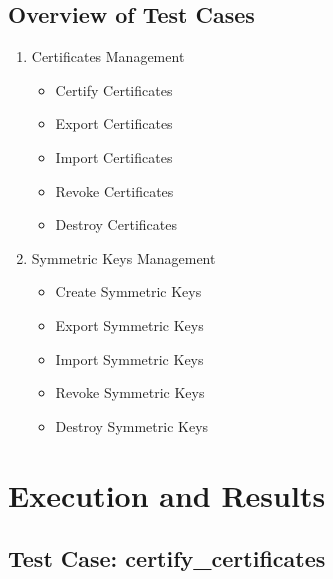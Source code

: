 \documentclass[a4paper,12pt]{article}
\begin{document}
\subsection{Overview of Test Cases}
\begin{enumerate}
    \setlength{\itemsep}{0pt} %
    \item Certificates Management
    \begin{itemize}
        \setlength{\itemsep}{0pt} %
        \item Certify Certificates
        \item Export Certificates
        \item Import Certificates
        \item Revoke Certificates
        \item Destroy Certificates
    \end{itemize}
    
    \item Symmetric Keys Management
    \begin{itemize}
        \setlength{\itemsep}{0pt} %
        \item Create Symmetric Keys
        \item Export Symmetric Keys
        \item Import Symmetric Keys
        \item Revoke Symmetric Keys
        \item Destroy Symmetric Keys
    \end{itemize}
\end{enumerate}

\newpage

\section{Execution and Results}

\subsection{Test Case: certify\_certificates}
\end{document}
